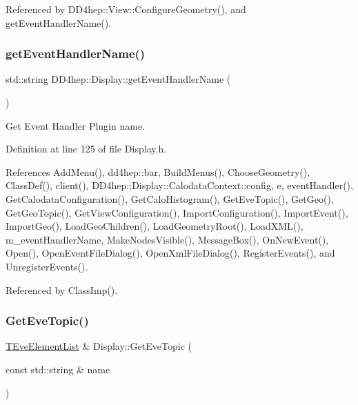 Referenced by D\+D4hep\+::\+View\+::\+Configure\+Geometry(), and get\+Event\+Handler\+Name().

\hypertarget{class_d_d4hep_1_1_display_a1772bccbb5c196bbf33d9cfadb0ce9ad}{}\label{class_d_d4hep_1_1_display_a1772bccbb5c196bbf33d9cfadb0ce9ad} 
\subsubsection{\texorpdfstring{get\+Event\+Handler\+Name()}{getEventHandlerName()}}
{\footnotesize\ttfamily std\+::string D\+D4hep\+::\+Display\+::get\+Event\+Handler\+Name (\begin{DoxyParamCaption}{ }\end{DoxyParamCaption})\hspace{0.3cm}{\ttfamily [inline]}}



Get Event Handler Plugin name. 



Definition at line 125 of file Display.\+h.



References Add\+Menu(), dd4hep\+::bar, Build\+Menus(), Choose\+Geometry(), Class\+Def(), client(), D\+D4hep\+::\+Display\+::\+Calodata\+Context\+::config, e, event\+Handler(), Get\+Calodata\+Configuration(), Get\+Calo\+Histogram(), Get\+Eve\+Topic(), Get\+Geo(), Get\+Geo\+Topic(), Get\+View\+Configuration(), Import\+Configuration(), Import\+Event(), Import\+Geo(), Load\+Geo\+Children(), Load\+Geometry\+Root(), Load\+X\+M\+L(), m\+\_\+event\+Handler\+Name, Make\+Nodes\+Visible(), Message\+Box(), On\+New\+Event(), Open(), Open\+Event\+File\+Dialog(), Open\+Xml\+File\+Dialog(), Register\+Events(), and Unregister\+Events().



Referenced by Class\+Imp().

\hypertarget{class_d_d4hep_1_1_display_afbc3b9ac94db611f0f0fd88dd323d650}{}\label{class_d_d4hep_1_1_display_afbc3b9ac94db611f0f0fd88dd323d650} 
\subsubsection{\texorpdfstring{Get\+Eve\+Topic()}{GetEveTopic()}\hspace{0.1cm}{\footnotesize\ttfamily [1/2]}}
{\footnotesize\ttfamily \hyperlink{class_t_eve_element_list}{T\+Eve\+Element\+List} \& Display\+::\+Get\+Eve\+Topic (\begin{DoxyParamCaption}\item[{const std\+::string \&}]{name }\end{DoxyParamCaption})\hspace{0.3cm}{\ttfamily [virtual]}}



